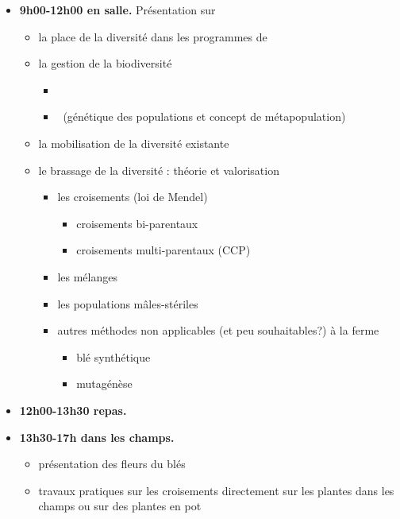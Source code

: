 \begin{itemize}
\item \textbf{9h00-12h00 en salle.} Présentation sur
	\begin{itemize}
	\item la place de la diversité dans les programmes de \SP
	\item la gestion de la biodiversité
		\begin{itemize}
			\item \exsitu
			\item \insitu~(génétique des populations et concept de métapopulation)
		\end{itemize}

	\item la mobilisation de la diversité existante
	\item le brassage de la diversité : théorie et valorisation
		\begin{itemize}
		\item les croisements (loi de Mendel)
			\begin{itemize}
			\item croisements bi-parentaux
			\item croisements multi-parentaux (CCP)			
			\end{itemize}
		
		\item les mélanges
		\item les populations mâles-stériles 
		\item autres méthodes non applicables (et peu souhaitables?) à la ferme 
			\begin{itemize}
			\item blé synthétique
			\item mutagénèse
			\end{itemize}
		\end{itemize}
	\end{itemize}

\item \textbf{12h00-13h30 repas.}

\item \textbf{13h30-17h dans les champs.}
	\begin{itemize}
	\item présentation des fleurs du blés
	\item travaux pratiques sur les croisements directement sur les plantes dans les champs ou sur des plantes en pot	
	\end{itemize}

\end{itemize}

\newpage
